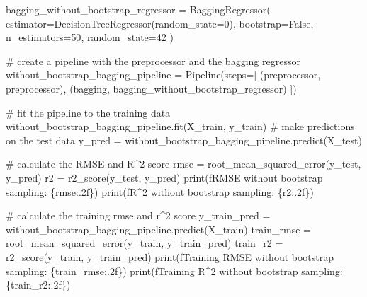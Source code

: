 \documentclass[
  letterpaper,
  DIV=11,
  numbers=noendperiod]{scrreprt}
\newenvironment{Shaded}{\begin{snugshade}}{\end{snugshade}}
\newcommand{\BuiltInTok}[1]{\textcolor[rgb]{0.00,0.23,0.31}{#1}}
\newcommand{\CommentTok}[1]{\textcolor[rgb]{0.37,0.37,0.37}{#1}}
\newcommand{\DecValTok}[1]{\textcolor[rgb]{0.68,0.00,0.00}{#1}}
\newcommand{\NormalTok}[1]{\textcolor[rgb]{0.00,0.23,0.31}{#1}}
\newcommand{\OperatorTok}[1]{\textcolor[rgb]{0.37,0.37,0.37}{#1}}
\newcommand{\SpecialCharTok}[1]{\textcolor[rgb]{0.37,0.37,0.37}{#1}}
\newcommand{\SpecialStringTok}[1]{\textcolor[rgb]{0.13,0.47,0.30}{#1}}
\newcommand{\StringTok}[1]{\textcolor[rgb]{0.13,0.47,0.30}{#1}}
\newcommand{\VariableTok}[1]{\textcolor[rgb]{0.07,0.07,0.07}{#1}}
\begin{document}
\begin{Shaded}
\begin{Highlighting}[]
\NormalTok{bagging\_without\_bootstrap\_regressor }\OperatorTok{=}\NormalTok{ BaggingRegressor(}
\NormalTok{    estimator}\OperatorTok{=}\NormalTok{DecisionTreeRegressor(random\_state}\OperatorTok{=}\DecValTok{0}\NormalTok{),}
\NormalTok{    bootstrap}\OperatorTok{=}\VariableTok{False}\NormalTok{,}
\NormalTok{    n\_estimators}\OperatorTok{=}\DecValTok{50}\NormalTok{,}
\NormalTok{    random\_state}\OperatorTok{=}\DecValTok{42}
\NormalTok{)}

\CommentTok{\# create a pipeline with the preprocessor and the bagging regressor}
\NormalTok{without\_bootstrap\_bagging\_pipeline }\OperatorTok{=}\NormalTok{ Pipeline(steps}\OperatorTok{=}\NormalTok{[}
\NormalTok{    (}\StringTok{\textquotesingle{}preprocessor\textquotesingle{}}\NormalTok{, preprocessor),}
\NormalTok{    (}\StringTok{\textquotesingle{}bagging\textquotesingle{}}\NormalTok{, bagging\_without\_bootstrap\_regressor)}
\NormalTok{])}

\CommentTok{\# fit the pipeline to the training data}
\NormalTok{without\_bootstrap\_bagging\_pipeline.fit(X\_train, y\_train)}
\CommentTok{\# make predictions on the test data}
\NormalTok{y\_pred }\OperatorTok{=}\NormalTok{ without\_bootstrap\_bagging\_pipeline.predict(X\_test)}

\CommentTok{\# calculate the RMSE and R\^{}2 score}
\NormalTok{rmse }\OperatorTok{=}\NormalTok{ root\_mean\_squared\_error(y\_test, y\_pred)}
\NormalTok{r2 }\OperatorTok{=}\NormalTok{ r2\_score(y\_test, y\_pred)}
\BuiltInTok{print}\NormalTok{(}\SpecialStringTok{f\textquotesingle{}RMSE without bootstrap sampling: }\SpecialCharTok{\{}\NormalTok{rmse}\SpecialCharTok{:.2f\}}\SpecialStringTok{\textquotesingle{}}\NormalTok{)}
\BuiltInTok{print}\NormalTok{(}\SpecialStringTok{f\textquotesingle{}R\^{}2 without bootstrap sampling: }\SpecialCharTok{\{}\NormalTok{r2}\SpecialCharTok{:.2f\}}\SpecialStringTok{\textquotesingle{}}\NormalTok{)}

\CommentTok{\# calculate the training rmse and r\^{}2 score}
\NormalTok{y\_train\_pred }\OperatorTok{=}\NormalTok{ without\_bootstrap\_bagging\_pipeline.predict(X\_train)}
\NormalTok{train\_rmse }\OperatorTok{=}\NormalTok{ root\_mean\_squared\_error(y\_train, y\_train\_pred)}
\NormalTok{train\_r2 }\OperatorTok{=}\NormalTok{ r2\_score(y\_train, y\_train\_pred)}
\BuiltInTok{print}\NormalTok{(}\SpecialStringTok{f\textquotesingle{}Training RMSE without bootstrap sampling: }\SpecialCharTok{\{}\NormalTok{train\_rmse}\SpecialCharTok{:.2f\}}\SpecialStringTok{\textquotesingle{}}\NormalTok{)}
\BuiltInTok{print}\NormalTok{(}\SpecialStringTok{f\textquotesingle{}Training R\^{}2 without bootstrap sampling: }\SpecialCharTok{\{}\NormalTok{train\_r2}\SpecialCharTok{:.2f\}}\SpecialStringTok{\textquotesingle{}}\NormalTok{)}
\end{Highlighting}
\end{Shaded}
\end{document}
